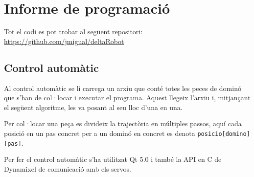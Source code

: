 \section{Informe de programació}

Tot el codi es pot trobar al següent repositori: \href{https://github.com/jmigual/deltaRobot}{https://github.com/jmigual/deltaRobot}

\subsection{Control automàtic}

Al control automàtic se li carrega un arxiu que conté totes les peces de dominó que s'han de col·locar i executar el programa. Aquest llegeix l'arxiu i, mitjançant el següent algoritme, les va posant al seu lloc d'una en una. 

Per col·locar una peça es divideix la trajectòria en múltiples passos, aquí cada posició en un pas concret per a un dominó en concret es denota \verb|posicio[domino][pas]|.
\newline

Per fer el control automàtic s'ha utilitzat Qt 5.0 i també la API en C de Dynamixel de comunicació amb els servos.

